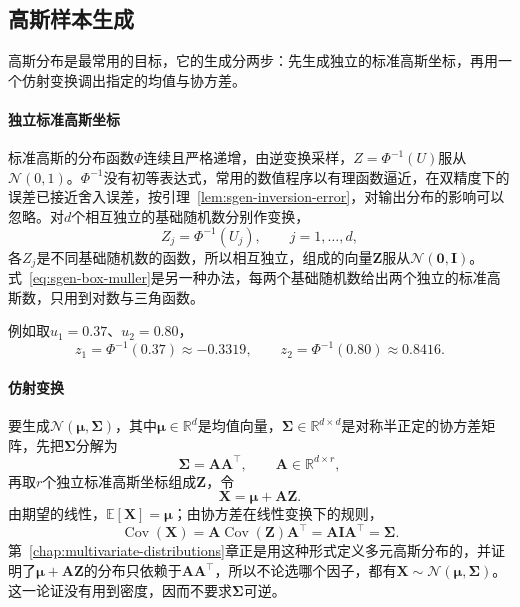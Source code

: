 \subsection{高斯样本生成}
\label{sec:sgen-gaussian}

高斯分布是最常用的目标，它的生成分两步：先生成独立的标准高斯坐标，再用一个仿射变换调出指定的均值与协方差。

\paragraph{独立标准高斯坐标}
标准高斯的分布函数$\Phi$连续且严格递增，由逆变换采样，$Z=\Phi^{-1}(U)$服从$\mathcal{N}(0,1)$。$\Phi^{-1}$没有初等表达式，常用的数值程序以有理函数逼近，在双精度下的误差已接近舍入误差，按引理~\ref{lem:sgen-inversion-error}，对输出分布的影响可以忽略。对$d$个相互独立的基础随机数分别作变换，
\[
  Z_j=\Phi^{-1}(U_j),\qquad j=1,\dots,d,
\]
各$Z_j$是不同基础随机数的函数，所以相互独立，组成的向量$\bm{Z}$服从$\mathcal{N}(\bm{0},\bm{I})$。式~\eqref{eq:sgen-box-muller}是另一种办法，每两个基础随机数给出两个独立的标准高斯数，只用到对数与三角函数。

例如取$u_1=0.37$、$u_2=0.80$，
\[
  z_1=\Phi^{-1}(0.37)\approx-0.3319,\qquad z_2=\Phi^{-1}(0.80)\approx0.8416 .
\]

\paragraph{仿射变换}
要生成$\mathcal{N}(\bm{\mu},\bm{\Sigma})$，其中$\bm{\mu}\in\mathbb{R}^{d}$是均值向量，$\bm{\Sigma}\in\mathbb{R}^{d\times d}$是对称半正定的协方差矩阵，先把$\bm{\Sigma}$分解为
\begin{equation}
  \bm{\Sigma}=\bm{A}\bm{A}^{\top},\qquad \bm{A}\in\mathbb{R}^{d\times r},
  \label{eq:sgen-cov-factor}
\end{equation}
再取$r$个独立标准高斯坐标组成$\bm{Z}$，令
\begin{equation}
  \bm{X}=\bm{\mu}+\bm{A}\bm{Z}.
  \label{eq:sgen-gaussian-affine}
\end{equation}
由期望的线性，$\mathbb{E}[\bm{X}]=\bm{\mu}$；由协方差在线性变换下的规则，
\[
  \operatorname{Cov}(\bm{X})=\bm{A}\operatorname{Cov}(\bm{Z})\bm{A}^{\top}=\bm{A}\bm{I}\bm{A}^{\top}=\bm{\Sigma}.
\]
第~\ref{chap:multivariate-distributions}章正是用这种形式定义多元高斯分布的，并证明了$\bm{\mu}+\bm{A}\bm{Z}$的分布只依赖于$\bm{A}\bm{A}^{\top}$，所以不论选哪个因子，都有$\bm{X}\sim\mathcal{N}(\bm{\mu},\bm{\Sigma})$。这一论证没有用到密度，因而不要求$\bm{\Sigma}$可逆。

